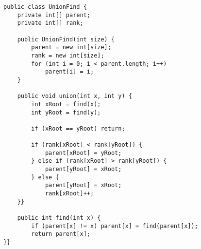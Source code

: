 \begin{verbatim}
public class UnionFind {
	private int[] parent;
	private int[] rank;
	
	public UnionFind(int size) {
		parent = new int[size];
		rank = new int[size];
		for (int i = 0; i < parent.length; i++)
			parent[i] = i;
	}
	
	public void union(int x, int y) {
		int xRoot = find(x);
		int yRoot = find(y);
		
		if (xRoot == yRoot)	return;
		
		if (rank[xRoot] < rank[yRoot]) {
			parent[xRoot] = yRoot;
		} else if (rank[xRoot] > rank[yRoot]) {
			parent[yRoot] = xRoot;
		} else {
			parent[yRoot] = xRoot;
			rank[xRoot]++;
	}}
	
	public int find(int x) {
		if (parent[x] != x) parent[x] = find(parent[x]);
		return parent[x];
}}
\end{verbatim}